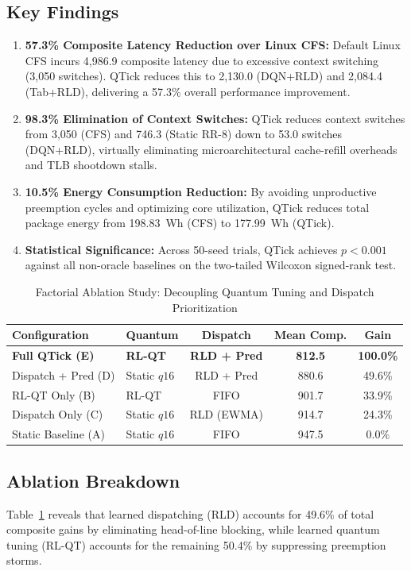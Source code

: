 \documentclass[journal]{IEEEtran}
\begin{document}
\subsection{Key Findings}
\begin{enumerate}
    \item \textbf{57.3\% Composite Latency Reduction over Linux CFS:} Default Linux CFS incurs 4,986.9 composite latency due to excessive context switching (3,050 switches). QTick reduces this to 2,130.0 (DQN+RLD) and 2,084.4 (Tab+RLD), delivering a 57.3\% overall performance improvement.
    \item \textbf{98.3\% Elimination of Context Switches:} QTick reduces context switches from 3,050 (CFS) and 746.3 (Static RR-8) down to 53.0 switches (DQN+RLD), virtually eliminating microarchitectural cache-refill overheads and TLB shootdown stalls.
    \item \textbf{10.5\% Energy Consumption Reduction:} By avoiding unproductive preemption cycles and optimizing core utilization, QTick reduces total package energy from 198.83~Wh (CFS) to 177.99~Wh (QTick).
    \item \textbf{Statistical Significance:} Across 50-seed trials, QTick achieves $p < 0.001$ against all non-oracle baselines on the two-tailed Wilcoxon signed-rank test.
\end{enumerate}

\begin{table}[t]
\centering
\caption{Factorial Ablation Study: Decoupling Quantum Tuning and Dispatch Prioritization}
\label{tab:ablation}
\begin{tabular}{llccc}
\toprule
\textbf{Configuration} & \textbf{Quantum} & \textbf{Dispatch} & \textbf{Mean Comp.} & \textbf{Gain} \\
\midrule
\textbf{Full QTick (E)} & \textbf{RL-QT} & \textbf{RLD + Pred} & \textbf{812.5} & \textbf{100.0\%} \\
Dispatch + Pred (D) & Static $q16$ & RLD + Pred & 880.6 & 49.6\% \\
RL-QT Only (B) & RL-QT & FIFO & 901.7 & 33.9\% \\
Dispatch Only (C) & Static $q16$ & RLD (EWMA) & 914.7 & 24.3\% \\
Static Baseline (A) & Static $q16$ & FIFO & 947.5 & 0.0\% \\
\bottomrule
\end{tabular}
\end{table}

\subsection{Ablation Breakdown}
Table~\ref{tab:ablation} reveals that learned dispatching (RLD) accounts for 49.6\% of total composite gains by eliminating head-of-line blocking, while learned quantum tuning (RL-QT) accounts for the remaining 50.4\% by suppressing preemption storms.
\end{document}
